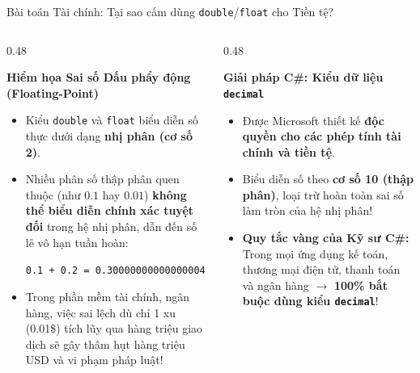 \documentclass[aspectratio=169, 10pt]{beamer}
\begin{document}
\begin{frame}{Bài toán Tài chính: Tại sao cấm dùng \texttt{double}/\texttt{float} cho Tiền tệ?}
  \begin{columns}[T]
    \begin{column}{0.48\textwidth}
      \begin{alertblock}{\textbf{Hiểm họa Sai số Dấu phẩy động (Floating-Point)}}
        \begin{itemize}\small
          \item Kiểu \texttt{double} và \texttt{float} biểu diễn số thực dưới dạng \textbf{nhị phân (cơ số 2)}.
          \item Nhiều phân số thập phân quen thuộc (như $0.1$ hay $0.01$) \textbf{không thể biểu diễn chính xác tuyệt đối} trong hệ nhị phân, dẫn đến số lẻ vô hạn tuần hoàn:
          \begin{center}
            \texttt{0.1 + 0.2 = 0.30000000000000004}
          \end{center}
          \item Trong phần mềm tài chính, ngân hàng, việc sai lệch dù chỉ 1 xu (0.01\$) tích lũy qua hàng triệu giao dịch sẽ gây thâm hụt hàng triệu USD và vi phạm pháp luật!
        \end{itemize}
      \end{alertblock}
    \end{column}

    \begin{column}{0.48\textwidth}
      \begin{exampleblock}{\textbf{Giải pháp C\#: Kiểu dữ liệu \texttt{decimal}}}
        \begin{itemize}\small
          \item Được Microsoft thiết kế \textbf{độc quyền cho các phép tính tài chính và tiền tệ}.
          \item Biểu diễn số theo \textbf{cơ số 10 (thập phân)}, loại trừ hoàn toàn sai số làm tròn của hệ nhị phân!
          \item \textbf{Quy tắc vàng của Kỹ sư C\#:} Trong mọi ứng dụng kế toán, thương mại điện tử, thanh toán và ngân hàng $\to$ \textbf{100\% bắt buộc dùng kiểu \texttt{decimal}}!
        \end{itemize}
      \end{exampleblock}
    \end{column}
  \end{columns}
\end{frame}
\end{document}
